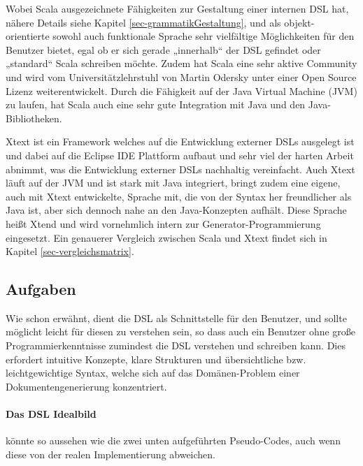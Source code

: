 Wobei Scala ausgezeichnete Fähigkeiten zur Gestaltung einer
internen DSL hat, nähere Details siehe Kapitel \ref{sec-grammatikGestaltung},
und als objekt-orientierte sowohl auch funktionale Sprache sehr
vielfältige Möglichkeiten für den Benutzer bietet, egal ob er sich
gerade „innerhalb“ der DSL gefindet oder „standard“ Scala schreiben
möchte. Zudem hat Scala eine sehr aktive Community und wird vom
Universitätzlehrstuhl von Martin Odersky unter einer Open Source Lizenz
weiterentwickelt.
Durch die Fähigkeit auf der Java Virtual Machine (JVM) zu laufen,
hat Scala auch eine sehr gute Integration mit Java und den
Java-Bibliotheken.

Xtext ist ein Framework welches auf die Entwicklung externer DSLs
ausgelegt ist und dabei auf die Eclipse IDE Plattform aufbaut
und sehr viel der harten Arbeit abnimmt, was die Entwicklung
externer DSLs nachhaltig vereinfacht.
Auch Xtext läuft auf der JVM und ist stark mit Java integriert, bringt
zudem eine eigene, auch mit Xtext entwickelte, Sprache mit, die von der
Syntax her freundlicher als Java ist, aber sich dennoch nahe an den
Java-Konzepten aufhält. Diese Sprache heißt Xtend und wird vornehmlich
intern zur Generator-Programmierung eingesetzt. Ein genauerer Vergleich
zwischen Scala und Xtext findet sich in Kapitel \ref{sec-vergleichsmatrix}.

\subsection{Aufgaben}

Wie schon erwähnt, dient die DSL als Schnittstelle für den Benutzer,
und sollte möglicht leicht für diesen zu verstehen sein, so dass
auch ein Benutzer ohne große Programmierkenntnisse zumindest die
DSL verstehen und schreiben kann. Dies erfordert intuitive Konzepte,
klare Strukturen und übersichtliche bzw. leichtgewichtige Syntax, welche
sich auf das Domänen-Problem einer Dokumentengenerierung konzentriert.

\paragraph{Das DSL Idealbild} könnte so aussehen wie die zwei unten
aufgeführten Pseudo-Codes, auch wenn diese von der
realen Implementierung abweichen. %

